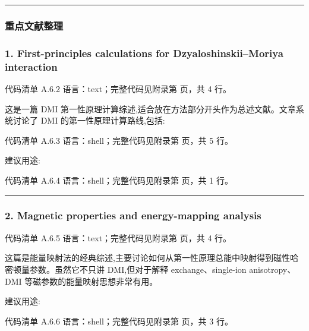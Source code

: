 \documentclass[lang=cn,scheme=chinese,color=blue,device=normal,toc=onecol,math=cm]{elegantbook}
\begin{document}
\medskip\hrule\medskip


\subsubsection{重点文献整理}


\subsubsection{1. First-principles calculations for Dzyaloshinskii–Moriya interaction}


\begin{codeindexbox}{代码清单 A.6.2}
语言：text；完整代码见附录第 \pageref{code:6:2} 页，共 4 行。
\end{codeindexbox}


这是一篇 DMI 第一性原理计算综述,适合放在方法部分开头作为总述文献。文章系统讨论了 DMI 的第一性原理计算路线,包括:\par


\begin{codeindexbox}{代码清单 A.6.3}
语言：shell；完整代码见附录第 \pageref{code:6:3} 页，共 5 行。
\end{codeindexbox}


建议用途:\par


\begin{codeindexbox}{代码清单 A.6.4}
语言：shell；完整代码见附录第 \pageref{code:6:4} 页，共 1 行。
\end{codeindexbox}


\medskip\hrule\medskip


\subsubsection{2. Magnetic properties and energy-mapping analysis}


\begin{codeindexbox}{代码清单 A.6.5}
语言：text；完整代码见附录第 \pageref{code:6:5} 页，共 4 行。
\end{codeindexbox}


这篇是能量映射法的经典综述,主要讨论如何从第一性原理总能中映射得到磁性哈密顿量参数。虽然它不只讲 DMI,但对于解释 exchange、single-ion anisotropy、DMI 等磁参数的能量映射思想非常有用。\par


建议用途:\par


\begin{codeindexbox}{代码清单 A.6.6}
语言：shell；完整代码见附录第 \pageref{code:6:6} 页，共 3 行。
\end{codeindexbox}
\end{document}
